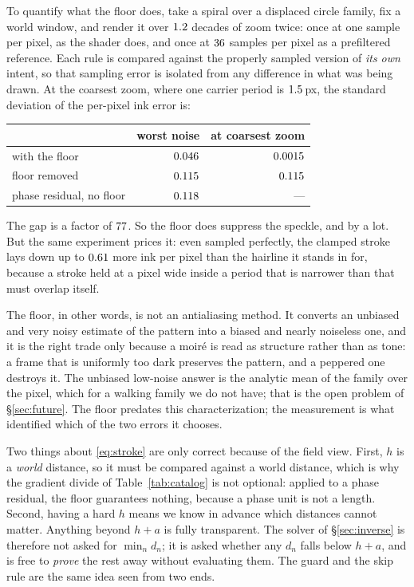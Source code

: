 To quantify what the floor does, take a spiral over a displaced circle family,
fix a world window, and render it over $1.2$ decades of zoom twice:
once at one sample per pixel, as the shader does, and once at $36$
samples per pixel as a prefiltered reference. Each rule is compared against the
properly sampled version of \emph{its own} intent, so that sampling error is
isolated from any difference in what was being drawn. At the coarsest zoom,
where one carrier period is $1.5$\,px, the standard deviation
of the per-pixel ink error is:
\begin{center}\small
\begin{tabular}{@{}lrr@{}}
  \toprule
  & worst noise & at coarsest zoom \\
  \midrule
  with the floor            & $0.046$   & $0.0015$ \\
  floor removed             & $0.115$ & $0.115$ \\
  phase residual, no floor  & $0.118$   &---\\
  \bottomrule
\end{tabular}
\end{center}\noindent The gap is a factor of $77$. So the floor
does suppress the speckle, and by a lot. But the same experiment prices it: even sampled perfectly, the clamped stroke
lays down up to $0.61$ more ink per pixel than the hairline it stands
in for, because a stroke held at a pixel wide inside a period that is narrower than
that must overlap itself.

The floor, in other words, is not an antialiasing method. It converts an unbiased
and very noisy estimate of the pattern into a biased and nearly noiseless one, and
it is the right trade only because a moir\'e is read as structure rather than as
tone: a frame that is uniformly too dark preserves the pattern, and a peppered
one destroys it. The unbiased low-noise answer is the analytic mean of the
family over the pixel, which for a walking family we do not have; that is the
open problem of \S\ref{sec:future}. The floor predates this characterization; the
measurement is what identified which of the two errors it chooses.

Two things about \eqref{eq:stroke} are only correct because of the field view.
First, $h$ is a \emph{world} distance, so it must be compared against a world
distance, which is why the gradient divide of Table~\ref{tab:catalog} is not
optional: applied to a phase residual, the floor guarantees nothing, because a
phase unit is not a length. Second, having a hard $h$ means we know in advance
which distances cannot matter. Anything beyond $h+a$ is fully
transparent. The solver of \S\ref{sec:inverse} is therefore not asked for
$\min_n d_n$; it is asked whether any $d_n$ falls below $h+a$, and is
free to \emph{prove} the rest away without evaluating them. The guard and the skip
rule are the same idea seen from two ends.

